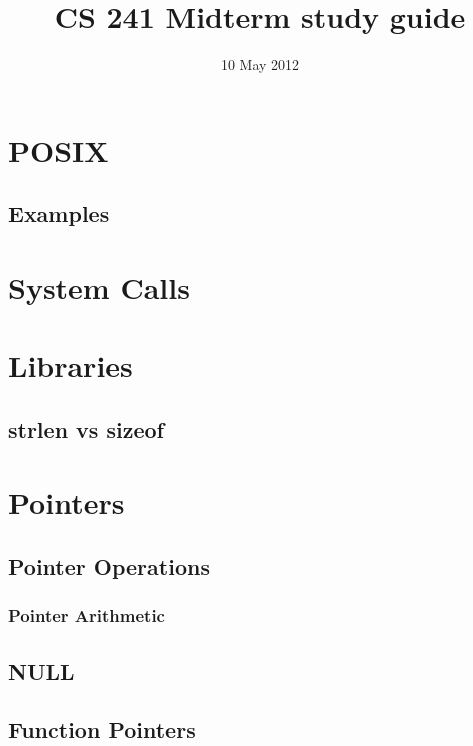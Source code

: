 \documentclass[11pt]{article}
\title{CS 241 Midterm study guide}
\author{}
\date{10 May 2012}
\begin{document}
\maketitle

\setcounter{tocdepth}{3}
\tableofcontents
\vspace*{1cm}
\section{POSIX}
\label{sec-1}

\subsection{Examples}
\label{sec-1.1}

\section{System Calls}
\label{sec-2}

\section{Libraries}
\label{sec-3}

\subsection{strlen vs sizeof}
\label{sec-3.1}

\section{Pointers}
\label{sec-4}

\subsection{Pointer Operations}
\label{sec-4.1}

\subsubsection{Pointer Arithmetic}
\label{sec-4.1.1}

\subsection{NULL}
\label{sec-4.2}

\subsection{Function Pointers}
\label{sec-4.3}
\end{document}
